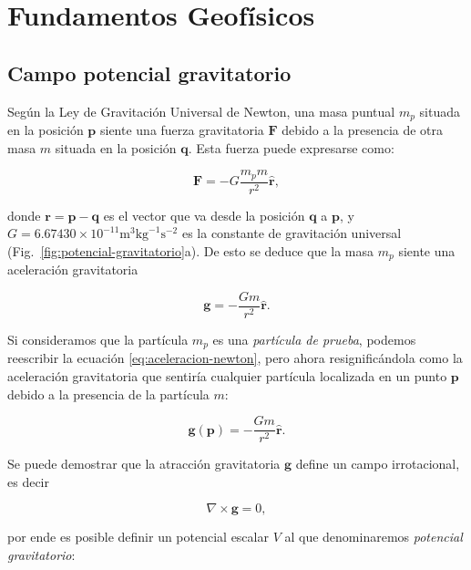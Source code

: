 \chapter{Fundamentos Geofísicos}

\section{Campo potencial gravitatorio}

Según la Ley de Gravitación Universal de Newton, una masa puntual $m_p$ situada
en la posición $\mathbf{p}$ siente una fuerza gravitatoria $\mathbf{F}$ debido
a la presencia de otra masa $m$ situada en la posición $\mathbf{q}$. Esta
fuerza puede expresarse como:

\begin{equation}
    \mathbf{F} = - G \frac{m_p m}{r^2} \mathbf{\hat{r}},
\end{equation}

\noindent donde $\mathbf{r} = \mathbf{p} - \mathbf{q}$ es el vector que va
desde la posición $\mathbf{q}$ a $\mathbf{p}$, y $G = 6.67430 \times
10^{-11} \text{m}^3 \text{kg}^{-1} \text{s}^{-2}$ es la constante de
gravitación universal (Fig.~\ref{fig:potencial-gravitatorio}a).
De esto se deduce que la masa $m_p$ siente una aceleración gravitatoria

\begin{equation}
    \mathbf{g} = - \frac{G m}{r^2} \mathbf{\hat{r}}.
    \label{eq:aceleracion-newton}
\end{equation}

Si consideramos que la partícula $m_p$ es una \emph{partícula de prueba},
podemos reescribir la ecuación \ref{eq:aceleracion-newton}, pero ahora
resignificándola como la aceleración gravitatoria que sentiría cualquier
partícula localizada en un punto $\mathbf{p}$ debido a la presencia de la
partícula $m$:

\begin{equation}
    \mathbf{g}(\mathbf{p}) = - \frac{G m}{r^2} \mathbf{\hat{r}}.
\end{equation}

Se puede demostrar que la atracción gravitatoria $\mathbf{g}$ define un campo
irrotacional, es decir

\begin{equation}
    \nabla \times \mathbf{g} = 0,
\end{equation}

\noindent por ende es posible definir un potencial escalar $V$ al que
denominaremos \emph{potencial gravitatorio}:

